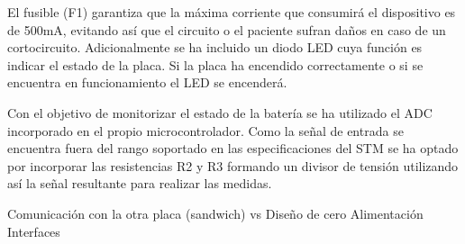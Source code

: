 El fusible (F1) garantiza que la máxima corriente que consumirá el dispositivo es de 500mA, evitando así que el circuito o el paciente sufran daños en caso de un cortocircuito. Adicionalmente se ha incluido un diodo \acrshort{LED} cuya función es indicar el estado de la placa. Si la placa ha encendido correctamente o si se encuentra en funcionamiento el \acrshort{LED} se encenderá.

Con el objetivo de monitorizar el estado de la batería se ha utilizado el \acrshort{ADC} incorporado en el propio microcontrolador. Como la señal de entrada se encuentra fuera del rango soportado en las especificaciones del STM se ha optado por incorporar las resistencias R2 y R3 formando un divisor de tensión utilizando así la señal resultante para realizar las medidas.



	Comunicación con la otra placa (sandwich) vs Diseño de cero
	Alimentación
	Interfaces

